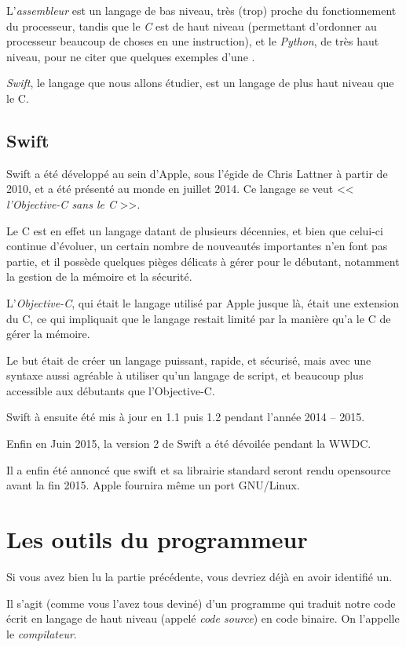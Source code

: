 
L'\emph{assembleur} est un langage de bas niveau,
très (trop) proche du fonctionnement du processeur,
tandis que le \emph{C} est de haut niveau
(permettant d'ordonner au processeur beaucoup de choses en une instruction),
et le \emph{Python}, de très haut niveau,
pour ne citer que quelques exemples d'une 
.

\emph{Swift}, le langage que nous allons étudier, est un langage de plus haut niveau
que le C.
\subsection{Swift}
Swift a été développé au sein d'Apple, sous l'égide de Chris Lattner à partir de 2010, et a
été présenté au monde en juillet 2014. Ce langage se veut << \emph{l'Objective-C sans le C} >>.

Le C est en effet un langage datant de plusieurs décennies,
et bien que celui-ci continue d'évoluer,
un certain nombre de nouveautés importantes n'en font pas partie,
et il possède quelques pièges délicats à gérer pour le débutant,
notamment la gestion de la mémoire et la sécurité.

L'\emph{Objective-C}, qui était le langage utilisé par Apple jusque là,
était une extension du C, ce qui impliquait que le langage restait limité
par la manière qu'a le C de gérer la mémoire.

Le but était de créer un langage puissant, rapide, et sécurisé, mais avec une syntaxe
aussi agréable à utiliser qu’un langage de script,
et beaucoup plus accessible aux débutants que l'Objective-C.

Swift à ensuite été mis à jour en 1.1 puis 1.2 pendant l'année 2014 -- 2015.

Enfin en Juin 2015, la version 2 de Swift a été dévoilée pendant la WWDC.

Il a enfin été annoncé que swift et sa librairie standard seront rendu opensource avant la fin 2015. Apple fournira même un port GNU/Linux.
\section{Les outils du programmeur}
Si vous avez bien lu la partie précédente, vous devriez déjà en avoir identifié un.

Il s'agit (comme vous l'avez tous deviné) d'un programme
qui traduit notre code écrit en langage de haut niveau (appelé \emph{code source}) en code binaire.
On l'appelle le \emph{compilateur}.

